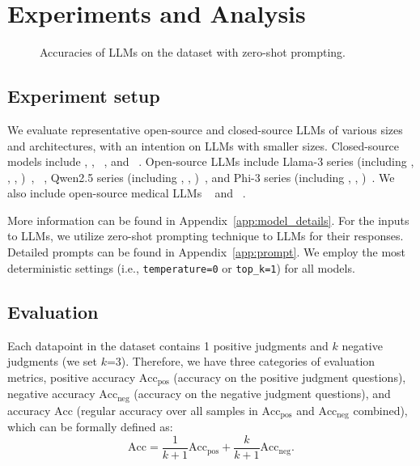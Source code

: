 \section{Experiments and Analysis}
\label{sec:exp}

\begin{figure*}[!ht]
    \vspace{-1.2em}
    \centering
    \caption{Accuracies of LLMs on the \mkj dataset with zero-shot prompting.}
    \label{fig:zo_performaces}
    \vspace{-1.3em}
\end{figure*}

\subsection{Experiment setup}
We evaluate representative open-source and closed-source LLMs of various sizes and architectures, with an intention on LLMs with smaller sizes. Closed-source models include \gptthree, \gptfour, \gptfouro~\cite{openai2023gpt4}, \claudea and \claudeb~\cite{claude2024}. 
Open-source LLMs include Llama-3 series (including \llamaa, \llamab, \llamac, \llamad)~\cite{dubey2024llama}, \ministral~\cite{ministral2024}, Qwen2.5 series (including \qwena, \qwenb, \qwenc)~\cite{qwen2.5}, and Phi-3 series (including \phia, \phib, \phic)~\cite{abdin2024phi}. We also include open-source medical LLMs \meditron~\cite{chen2023meditron70b} and \mellama~\cite{xie2024me}. 

More information can be found in Appendix~\ref{app:model_details}.
For the inputs to LLMs, we utilize zero-shot prompting technique to LLMs for their responses. Detailed prompts can be found in Appendix~\ref{app:prompt}.
We employ the most deterministic settings (i.e., \texttt{temperature=0} or \texttt{top\_k=1}) for all models. 


\subsection{Evaluation}
Each datapoint in the \mkj{} dataset contains 1 positive judgments and $k$ negative judgments (we set $k$=3). Therefore, we have three categories of evaluation metrics, positive accuracy $\text{Acc}_\text{pos}$ (accuracy on the positive judgment questions), negative accuracy $\text{Acc}_\text{neg}$ (accuracy on the negative judgment questions), and accuracy $\text{Acc}$ (regular accuracy over all samples in $\text{Acc}_\text{pos}$ and $\text{Acc}_\text{neg}$ combined), which can be formally defined as:
\begin{equation*}
\text{Acc} = \frac{1}{k+1} \text{Acc}_\text{pos} + \frac{k}{k+1} \text{Acc}_\text{neg}.
\end{equation*}


